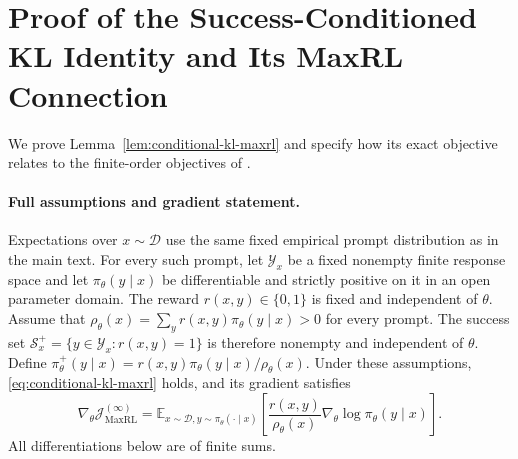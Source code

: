 \section{Proof of the Success-Conditioned KL Identity and Its MaxRL Connection}
\label{app:conditional-kl-maxrl}

We prove Lemma~\ref{lem:conditional-kl-maxrl} and specify how its exact
objective relates to the finite-order objectives of
\citet{tajwar_maximum_2026}.

\paragraph{Full assumptions and gradient statement.}
Expectations over $x\sim\mathcal D$ use the same fixed empirical prompt
distribution as in the main text. For every such prompt, let
$\mathcal Y_x$ be a fixed nonempty finite response space and let
$\pi_\theta(y\mid x)$ be differentiable and strictly positive on it
in an open parameter domain. The reward $r(x,y)\in\{0,1\}$ is fixed
and independent of $\theta$. Assume that
$\rho_\theta(x)=\sum_y r(x,y)\pi_\theta(y\mid x)>0$ for every prompt.
The success set $\mathcal S_x^+=\{y\in\mathcal Y_x:r(x,y)=1\}$ is
therefore nonempty and independent of $\theta$. Define
$\pi_\theta^+(y\mid x)=r(x,y)\pi_\theta(y\mid x)/\rho_\theta(x)$.
Under these assumptions, \eqref{eq:conditional-kl-maxrl} holds, and its
gradient satisfies
\begin{equation}
 \nabla_\theta\mathcal J_{\mathrm{MaxRL}}^{(\infty)}
 =\mathbb E_{x\sim\mathcal D,y\sim\pi_\theta(\cdot\mid x)}
 \left[\frac{r(x,y)}{\rho_\theta(x)}
              \nabla_\theta\log\pi_\theta(y\mid x)\right].
 \label{eq:maxrl-gradient}
\end{equation}
All differentiations below are of finite sums.

